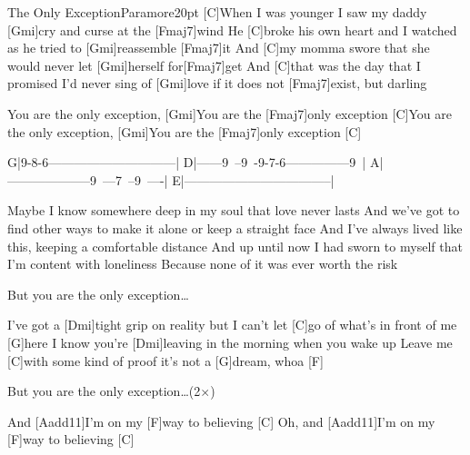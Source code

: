 \begin{song}{The Only Exception}{Paramore}{20pt}
%
[C]When I was younger I saw my daddy [Gmi]cry and curse at the [Fmaj7]wind
He [C]broke his own heart and I watched as he tried to [Gmi]reassemble [Fmaj7]it
And [C]my momma swore that she would never let [Gmi]herself for[Fmaj7]get
And [C]that was the day that I promised I'd never sing of [Gmi]love
if it does not [Fmaj7]exist, but darling

\chorus%
[C]You are the only exception, [Gmi]You are the [Fmaj7]only exception
[C]You are the only exception, [Gmi]You are the [Fmaj7]only exception [C]{}

\tabs
G|9-8-6------------------------------|
D|------9~--9~-9-7-6---------------9~|
A|--------------------9~---7~--9~----|
E|-----------------------------------|
\endtabs

%
Maybe I know somewhere deep in my soul that love never lasts
And we've got to find other ways to make it alone or keep a straight face
And I've always lived like this, keeping a comfortable distance
And up until now I had sworn to myself that I'm content with loneliness
Because none of it was ever worth the risk

\chorus But you are the only exception\dots

\verse{*}%
I've got a [Dmi]tight grip on reality but I can't 
let [C]go of what's in front of me [G]here
I know you're [Dmi]leaving in the morning when you wake up
Leave me [C]with some kind of proof it's not a [G]dream, whoa [F]{}

\chorus But you are the only exception\dots (2$\times$)

\verse{*}%
And [Aadd11]I'm on my [F]way to believing [C]{}
Oh, and [Aadd11]I'm on my [F]way to believing [C]{}
\end{song}
